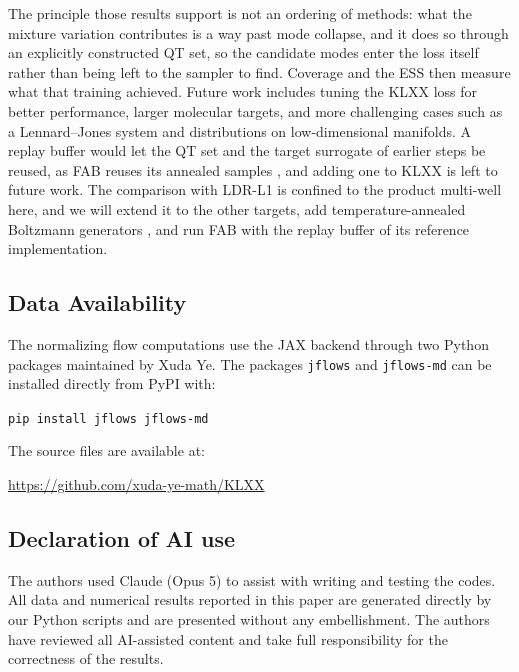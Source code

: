 \documentclass{article}
\begin{document}
The principle those results support is not an ordering of methods: what the mixture variation contributes is a way past mode collapse, and it does so through an explicitly constructed QT set, so the candidate modes enter the loss itself rather than being left to the sampler to find. Coverage and the ESS then measure what that training achieved. Future work includes tuning the KLXX loss for better performance, larger molecular targets, and more challenging cases such as a Lennard--Jones system and distributions on low-dimensional manifolds. A replay buffer would let the QT set and the target surrogate of earlier steps be reused, as FAB reuses its annealed samples \citep{midgley2022flow}, and adding one to KLXX is left to future work. The comparison with LDR-L1 \citep{schopmans2026ldr} is confined to the product multi-well here, and we will extend it to the other targets, add temperature-annealed Boltzmann generators \citep{schopmans2025temperature}, and run FAB with the replay buffer of its reference implementation. 

\subsection*{Data Availability}

The normalizing flow computations use the JAX backend through two Python packages maintained by Xuda Ye. The packages \texttt{jflows} and \texttt{jflows-md} can be installed directly from PyPI with:
\begin{tcolorbox}[colback=gray!12,boxrule=0pt,arc=2pt,left=6pt,right=6pt,top=4pt,bottom=4pt]
\texttt{pip install jflows jflows-md}
\end{tcolorbox}
\noindent
The source files are available at:
\begin{tcolorbox}[colback=gray!12,boxrule=0pt,arc=2pt,left=6pt,right=6pt,top=4pt,bottom=4pt]
\url{https://github.com/xuda-ye-math/KLXX}
\end{tcolorbox}

\subsection*{Declaration of AI use}
The authors used Claude (Opus 5) to assist with writing and testing the codes. All data and numerical results reported in this paper are generated directly by our Python scripts and are presented without any embellishment. The authors have reviewed all AI-assisted content and take full responsibility for the correctness of the results.
\end{document}
